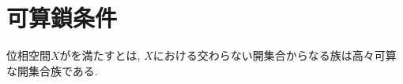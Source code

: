 \documentclass[uplatex, dvipdfmx, a4paper, 12pt, class=jsbook, crop=false]{standalone}
\begin{document}
\section{可算鎖条件}
\label{sec:countable-chain-condition}

\begin{definition}
	位相空間$ X $がを満たすとは,
	$ X $における交わらない開集合からなる族は高々可算な開集合族である.
\end{definition}
\end{document}
